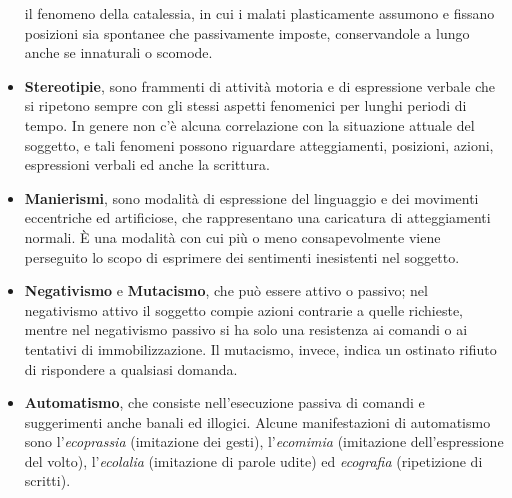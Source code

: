 \documentclass[]{article}
\begin{document}
\begin{itemize}
  il fenomeno della catalessia, in cui i malati plasticamente assumono e
  fissano posizioni sia spontanee che passivamente imposte,
  conservandole a lungo anche se innaturali o scomode.
\item
  \textbf{Stereotipie}, sono frammenti di attività motoria e di
  espressione verbale che si ripetono sempre con gli stessi aspetti
  fenomenici per lunghi periodi di tempo. In genere non c'è alcuna
  correlazione con la situazione attuale del soggetto, e tali fenomeni
  possono riguardare atteggiamenti, posizioni, azioni, espressioni
  verbali ed anche la scrittura.
\item
  \textbf{Manierismi}, sono modalità di espressione del linguaggio e dei
  movimenti eccentriche ed artificiose, che rappresentano una caricatura
  di atteggiamenti normali. È una modalità con cui più o meno
  consapevolmente viene perseguito lo scopo di esprimere dei sentimenti
  inesistenti nel soggetto.
\item
  \textbf{Negativismo} e \textbf{Mutacismo}, che può essere attivo o
  passivo; nel negativismo attivo il soggetto compie azioni contrarie a
  quelle richieste, mentre nel negativismo passivo si ha solo una
  resistenza ai comandi o ai tentativi di immobilizzazione. Il
  mutacismo, invece, indica un ostinato rifiuto di rispondere a
  qualsiasi domanda.
\item
  \textbf{Automatismo}, che consiste nell'esecuzione passiva di comandi
  e suggerimenti anche banali ed illogici. Alcune manifestazioni di
  automatismo sono l'\emph{ecoprassia} (imitazione dei gesti),
  l'\emph{ecomimia} (imitazione dell'espressione del volto),
  l'\emph{ecolalia} (imitazione di parole udite) ed \emph{ecografia}
  (ripetizione di scritti).
\end{itemize}
\end{document}
